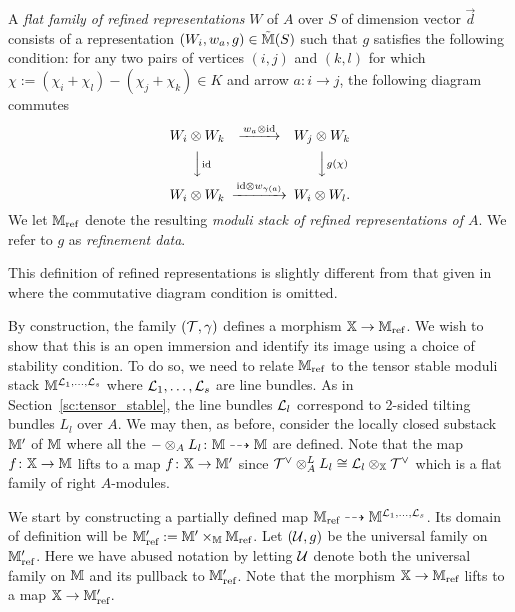 \documentclass[12pt]{amsart}
\begin{document}
\begin{definition} \label{def:refined}
A {\em flat family of refined representations} $W$ of $A$ over $S$ of dimension vector $\vec{d}$ consists of a representation $(W_i, w_a, g) \in \tilde{\mathbb{M}}(S)$ such that $g$ satisfies the following condition: for any two pairs of vertices $(i,j)$ and $(k,l)$ for which $\chi:= (\chi_i + \chi_l)-(\chi_j + \chi_k) \in K$ and arrow $a \colon i \rightarrow j$, the following diagram commutes
\begin{equation}  \label{eqn:refined}
\begin{CD}
W_i \otimes W_k @>w_a \otimes \text{id}>> W_j \otimes W_k\\
@VV\text{id}V @VVg(\chi)V\\
W_i \otimes W_k @>\text{id} \otimes w_{\gamma(a)}>> W_i \otimes W_l.
\end{CD}
\end{equation}
We let $\mathbb{M}_{\text{ref}}$ denote the resulting {\em moduli stack of refined representations of $A$}. We refer to $g$ as {\em refinement data}. 
\end{definition}


\begin{remark}
This definition of refined representations is slightly different from that given in \cite[Definition 3.2]{Abd} where the commutative diagram condition is omitted.
\end{remark}
By construction, the family $(\mathcal{T}, \gamma)$ defines a morphism $\mathbb{X} \rightarrow \mathbb{M}_{\text{ref}}$. We wish to show that this is an open immersion and identify its image using a choice of stability condition. To do so, we need to relate $\mathbb{M}_{\text{ref}}$ to the tensor stable moduli stack $\mathbb{M}^{\mathcal{L}_1,\ldots,\mathcal{L}_s}$ where $\mathcal{L}_1,\ldots, \mathcal{L}_s$ are line bundles. As in Section~\ref{sc:tensor_stable}, the line bundles $\mathcal{L}_l$ correspond to 2-sided tilting bundles $L_l$ over $A$. We may then, as before, consider the locally closed substack $\mathbb{M}'$ of $\mathbb{M}$ where all the $-\otimes_A L_l \colon \mathbb{M} \dashrightarrow \mathbb{M}$ are defined. Note that the map $f \colon \mathbb{X} \rightarrow \mathbb{M}$ lifts to a map $f \colon \mathbb{X} \rightarrow \mathbb{M}'$ since $\mathcal{T}^{\vee} \otimes_A^L L_l \cong \mathcal{L}_l \otimes_{\mathbb{X}} \mathcal{T}^{\vee}$ which is a flat family of right $A$-modules. 

 We start by constructing a partially defined map $\mathbb{M}_{\text{ref}} \dashrightarrow \mathbb{M}^{\mathcal{L}_1,\dots,\mathcal{L}_s}$. Its domain of definition will be $\mathbb{M}'_{\text{ref}} := \mathbb{M}' \times_{\mathbb{M}} \mathbb{M}_{\text{ref}}$. Let $(\mathcal{U},g)$ be the universal family on $\mathbb{M}'_{\text{ref}}$. Here we have abused notation by letting $\mathcal{U}$ denote both the universal family on $\mathbb{M}$ and its pullback to $\mathbb{M}'_{\text{ref}}$. Note that the morphism $\mathbb{X} \rightarrow \mathbb{M}_{\text{ref}}$ lifts to a map $\mathbb{X} \rightarrow \mathbb{M}'_{\text{ref}}$. 
\end{document}
